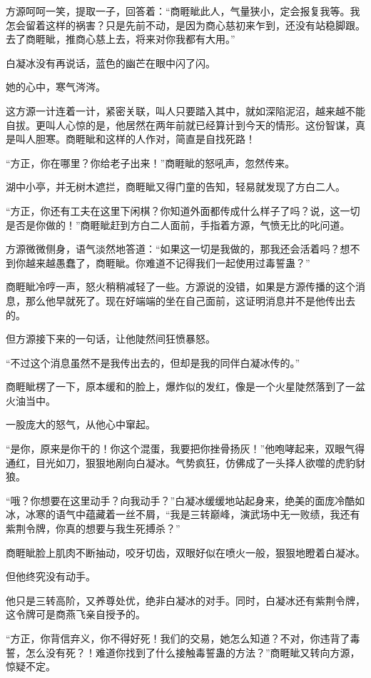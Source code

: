 \begin{this_body}
方源呵呵一笑，提取一子，回答着：“商睚眦此人，气量狭小，定会报复我等。我怎会留着这样的祸害？只是先前不动，是因为商心慈初来乍到，还没有站稳脚跟。去了商睚眦，推商心慈上去，将来对你我都有大用。”

白凝冰没有再说话，蓝色的幽芒在眼中闪了闪。

她的心中，寒气涔涔。

这方源一计连着一计，紧密关联，叫人只要踏入其中，就如深陷泥沼，越来越不能自拔。更叫人心惊的是，他居然在两年前就已经算计到今天的情形。这份智谋，真是叫人胆寒。商睚眦和这样的人作对，简直是自找死路！

“方正，你在哪里？你给老子出来！”商睚眦的怒吼声，忽然传来。

湖中小亭，并无树木遮拦，商睚眦又得门童的告知，轻易就发现了方白二人。

“方正，你还有工夫在这里下闲棋？你知道外面都传成什么样子了吗？说，这一切是否是你做的！”商睚眦赶到方白二人面前，手指着方源，气愤无比的叱问道。

方源微微侧身，语气淡然地答道：“如果这一切是我做的，那我还会活着吗？想不到你越来越愚蠢了，商睚眦。你难道不记得我们一起使用过毒誓蛊？”

商睚眦冷哼一声，怒火稍稍减轻了一些。方源说的没错，如果是方源传播的这个消息，那么他早就死了。现在好端端的坐在自己面前，这证明消息并不是他传出去的。

但方源接下来的一句话，让他陡然间狂愤暴怒。

“不过这个消息虽然不是我传出去的，但却是我的同伴白凝冰传的。”

商睚眦楞了一下，原本缓和的脸上，爆炸似的发红，像是一个火星陡然落到了一盆火油当中。

一股庞大的怒气，从他心中窜起。

“是你，原来是你干的！你这个混蛋，我要把你挫骨扬灰！”他咆哮起来，双眼气得通红，目光如刀，狠狠地剐向白凝冰。气势疯狂，仿佛成了一头择人欲噬的虎豹豺狼。

“哦？你想要在这里动手？向我动手？”白凝冰缓缓地站起身来，绝美的面庞冷酷如冰，冰寒的语气中蕴藏着一丝不屑，“我是三转巅峰，演武场中无一败绩，我还有紫荆令牌，你真的想要与我生死搏杀？”

商睚眦脸上肌肉不断抽动，咬牙切齿，双眼好似在喷火一般，狠狠地瞪着白凝冰。

但他终究没有动手。

他只是三转高阶，又养尊处优，绝非白凝冰的对手。同时，白凝冰还有紫荆令牌，这令牌可是商燕飞亲自授予的。

“方正，你背信弃义，你不得好死！我们的交易，她怎么知道？不对，你违背了毒誓，怎么没有死？！难道你找到了什么接触毒誓蛊的方法？”商睚眦又转向方源，惊疑不定。


\end{this_body}

